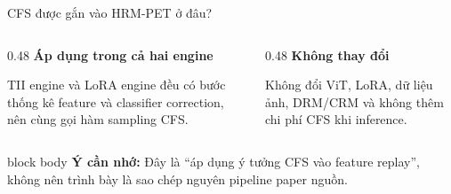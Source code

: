 \documentclass[aspectratio=169,11pt]{beamer}
\newcommand{\remember}[1]{%
  \vfill
  \begin{beamercolorbox}[wd=\textwidth,sep=0.22cm,rounded=true]{block body}
    \textbf{Ý cần nhớ:} #1
  \end{beamercolorbox}
}
\begin{document}
\begin{frame}{CFS được gắn vào HRM-PET ở đâu?}
  \centering
  \vspace{0.35cm}

  \vspace{0.65cm}
  \begin{columns}[T,onlytextwidth]
    \begin{column}{0.48\textwidth}
      \textbf{Áp dụng trong cả hai engine}\par
      TII engine và LoRA engine đều có bước thống kê feature và classifier correction, nên cùng gọi hàm sampling CFS.
    \end{column}
    \begin{column}{0.48\textwidth}
      \textbf{Không thay đổi}\par
      Không đổi ViT, LoRA, dữ liệu ảnh, DRM/CRM và không thêm chi phí CFS khi inference.
    \end{column}
  \end{columns}
  \remember{Đây là ``áp dụng ý tưởng CFS vào feature replay'', không nên trình bày là sao chép nguyên pipeline paper nguồn.}
\end{frame}
\end{document}
